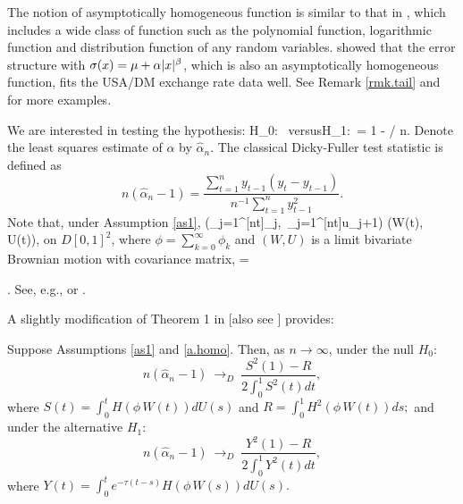 \begin{rem}
The notion of asymptotically homogeneous function is similar to that in \citet[][\citeyear{parkphillips2001}]{parkphillips1999}, which includes a wide class of function such as  the polynomial function, logarithmic function and distribution function of any random variables.  \cite{park2002} showed that the error structure with $\sigma(x) = \mu + \alpha |x|^\beta$, which is also an asymptotically homogeneous function, fits the USA/DM exchange rate data well. See Remark \ref{rmk.tail} and \cite{parkphillips1999} for more examples.
\end{rem}
 We are interested in testing the hypothesis: \be H_0:\ \quad
\mbox{versus}\quad H_1:\ \alpha = 1 - \tau / n.  \ee Denote the
least squares estimate of $\alpha$ by $\widehat \alpha_n$. The classical Dicky-Fuller test statistic is defined as
\begin{equation}\label{eqn42} n(\widehat \alpha_n - 1)
=  \frac{\sum_{t = 1}^n y_{t-1} (y_{t} - y_{t-1}) }{ n^{-1}
\sum_{t=1}^n y_{t-1}^2 }. \end{equation}
Note that, under Assumption \ref{as1},
\be  {}
\big(\sum_{j=1}^{[nt]}\xi_j,\ \sum_{j=1}^{[nt]}u_{j+1}\big) \Rightarrow (W(t), U(t)),
\ee
on $D[0,1]^2$,
where $\phi=\sum_{k=0}^{\infty}\phi_k$ and  $(W,U)$ is a limit bivariate Brownian motion with covariance matrix,
\be {}
\Delta = .
\ee
See, e.g., \cite{phillipsdurlauf1986} or \cite{phillipssolo1992}.

A slightly modification  of Theorem 1 in \cite{cavalieretaylor2009} [also see \cite{hansen1995}] provides:

\begin{thm}\label{thm.NNHUnitRoot} Suppose Assumptions \ref{as1} and \ref{a.homo}. Then, as $n\to\infty$, under the null $H_0$:
\begin{equation}\label{th21.eqn1} n(\widehat \alpha_n - 1) \ \to_D\ \frac{S^2(1) - R} { 2 \int_{0}^{1} S^2(t) dt },  \end{equation}
 where
$
S(t) = \int_{0}^{t} H(\phi\, W(t)) dU(s)$ and $R = \int_{0}^{1} H^2(\phi\,W(t)) ds;$ and under the alternative $H_1$:
\begin{equation}\label{th21.eqn2} n(\widehat \alpha_n - 1) \ \to_D\ \frac{Y^2(1) - R}
{ 2 \int_{0}^{1} Y^2(t) dt },  \end{equation}
 where
$
Y(t) = \int_{0}^{t} e^{-\tau (t - s)} H(\phi\, W(s)) dU(s).
$
\end{thm}

